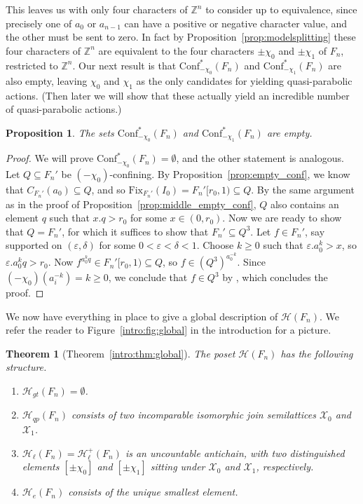 \documentclass[10pt,a4paper]{article}
\newtheorem{theo}[cdrthm]{Theorem}
\newtheorem{prop}[cdrthm]{Proposition}
\theoremstyle{definition}
\theoremstyle{remark}
\newcommand{\Z}{\mathbb{Z}}
\newcommand{\Fix}{\mathrm{Fix}}
\newcommand{\Hyp}{\mathcal{H}}
\newcommand{\Conf}{\mathrm{Conf}}
\newcommand{\X}{\mathcal{X}}
\theoremstyle{plain}
\begin{document}
This leaves us with only four characters of $\Z^n$ to consider up to equivalence, since precisely one of $a_0$ or $a_{n-1}$ can have a positive or negative character value, and the other must be sent to zero. In fact by Proposition~\ref{prop:modelsplitting} these four characters of $\Z^n$ are equivalent to the four characters $\pm\chi_0$ and $\pm\chi_1$ of $F_n$, restricted to $\Z^n$. Our next result is that $\Conf^\ast_{-\chi_0}(F_n)$ and $\Conf^\ast_{-\chi_1}(F_n)$ are also empty, leaving $\chi_0$ and $\chi_1$ as the only candidates for yielding quasi-parabolic actions. (Then later we will show that these actually yield an incredible number of quasi-parabolic actions.)

\begin{prop}\label{prop:last_empty_conf}
The sets $\Conf^\ast_{-\chi_0}(F_n)$ and $\Conf^\ast_{-\chi_1}(F_n)$ are empty.
\end{prop}

\begin{proof}
We will prove $\Conf^\ast_{-\chi_0}(F_n)=\emptyset$, and the other statement is analogous. Let $Q\subseteq F_n'$ be $(-\chi_0)$-confining. By Proposition~\ref{prop:empty_conf}, we know that $C_{F_n'}(a_0) \subseteq Q$, and so $\Fix_{F_n'}(I_0)=F_n'[r_0,1)\subseteq Q$. By the same argument as in the proof of Proposition~\ref{prop:middle_empty_conf}, $Q$ also contains an element $q$ such that $x.q>r_0$ for some $x\in (0,r_0)$. Now we are ready to show that $Q=F_n'$, for which it suffices to show that $F_n' \subseteq Q^3$. Let $f\in F_n'$, say supported on $(\varepsilon,\delta)$ for some $0<\varepsilon<\delta<1$. Choose $k\ge 0$ such that $\varepsilon.a_0^k>x$, so $\varepsilon.a_0^k q > r_0$. Now $f^{a_0^k q}\in F_n'[r_0,1)\subseteq Q$, so $f\in (Q^3)^{a_0^{-k}}$. Since $(-\chi_0)(a_i^{-k})=k\ge 0$, we conclude that $f\in Q^3$ by \StayInConf, which concludes the proof.
\end{proof}

We now have everything in place to give a global description of $\Hyp(F_n)$. We refer the reader to Figure~\ref{intro:fig:global} in the introduction for a picture.


\begin{theo}[Theorem~\ref{intro:thm:global}]\label{thm:global}
The poset $\Hyp(F_n)$ has the following structure.
\begin{enumerate}
   \item $\Hyp_{gt}(F_n) = \emptyset$.
   \item $\Hyp_{qp}(F_n)$ consists of two incomparable isomorphic join semilattices $\X_0$ and $\X_1$.
   \item $\Hyp_{\ell}(F_n) = \Hyp_{\ell}^+(F_n)$ is an uncountable antichain, with two distinguished elements $[\pm\chi_0]$ and $[\pm\chi_1]$ sitting under $\X_0$ and $\X_1$, respectively.
   \item $\Hyp_e(F_n)$ consists of the unique smallest element.
\end{enumerate}
\end{theo}
\end{document}
